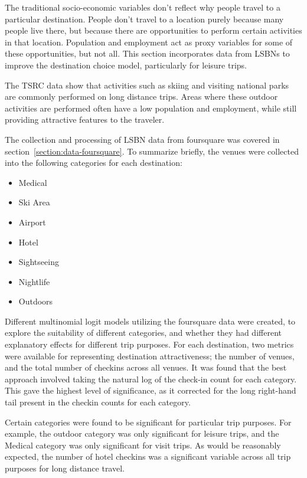 The traditional socio-economic variables don't reflect why people travel to a particular destination. People don't travel to a location purely because many people live there, but because there are opportunities to perform certain activities in that location. Population and employment act as proxy variables for some of these opportunities, but not all. This section incorporates data from LSBNs to improve the destination choice model, particularly for leisure trips.  

The TSRC data show that activities such as skiing and visiting national parks are commonly performed on long distance trips. Areas where these outdoor activities are performed often have a low population and employment, while still providing attractive features to the traveler.

The collection and processing of LSBN data from foursquare was covered in section~\ref{section:data-foursquare}. To summarize briefly, the venues were collected into the following categories for each destination:
\begin{multicols}{2}
\raggedcolumns
\begin{itemize}
\item Medical
\item Ski Area
\item Airport
\item Hotel
\item Sightseeing
\item Nightlife
\item Outdoors
\end{itemize}
\end{multicols}


Different multinomial logit models utilizing the foursquare data were created, to explore the suitability of different categories, and whether they had different explanatory effects for different trip purposes. For each destination, two metrics were available for representing destination attractiveness; the number of venues, and the total number of checkins across all venues.
It was found that the best approach involved taking the natural log of the check-in count for each category. This gave the highest level of significance, as it corrected for the long right-hand tail present in the checkin counts for each category.

Certain categories were found to be significant for particular trip purposes. For example, the outdoor category was only significant for leisure trips, and the Medical category was only significant for visit trips. As would be reasonably expected, the number of hotel checkins was a significant variable across all trip purposes for long distance travel.

